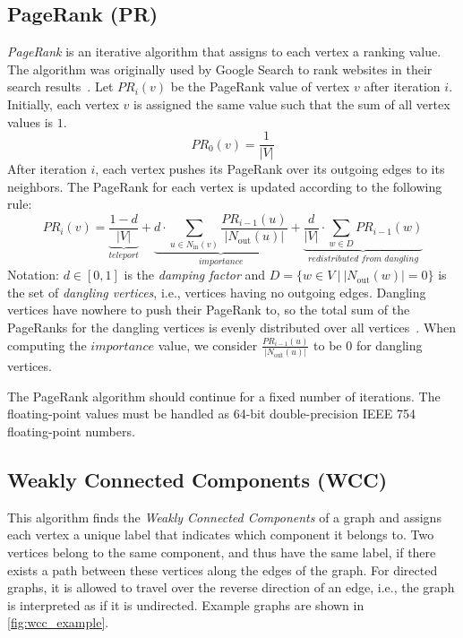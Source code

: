 \subsection{PageRank (PR)}
\label{sec:pr}
\emph{PageRank} is an iterative algorithm that assigns to each vertex a ranking value. The algorithm was originally used by Google Search to rank websites in their search results~\cite{page1999pagerank}. Let $\textit{PR}_i(v)$ be the PageRank value of vertex $v$ after iteration $i$. Initially, each vertex $v$ is assigned the same value such that the sum of all vertex values is $1$.
%
\begin{equation}
\textit{PR}_0(v) = \frac{1}{|V|}
\end{equation}
%
After iteration $i$, each vertex pushes its PageRank over its outgoing edges to its neighbors. The PageRank for each vertex is updated according to the following rule:
%
\begin{equation}
\textit{PR}_i(v) =
  \underbrace{\frac{1-d}{|V|}}_\textit{teleport} +
  \underbrace{d \cdot \sum_{u \in N_\mathrm{in}(v)} \frac{\textit{PR}_{i - 1}(u)}{|N_\mathrm{out}(u)|}}_\textit{importance} +
  \underbrace{\frac{d}{|V|} \cdot \sum_{w \in D} \textit{PR}_{i - 1}(w)}_\textit{redistributed from dangling}
\end{equation}
%
Notation: $d \in [0,1]$ is the \emph{damping factor} and $D = \big\{w \in V \ \big| \ |N_\mathrm{out}(w)| = 0 \big\}$ is the set of \emph{dangling vertices}, i.e., vertices having no outgoing edges.
Dangling vertices have nowhere to push their PageRank to, so the total sum of the PageRanks for the dangling vertices is evenly distributed over all vertices~\cite{DBLP:conf/www/EironMT04}.
When computing the $\textit{importance}$ value, we consider $\frac{\textit{PR}_{i-1}(u)}{|N_\mathrm{out}(u)|}$ to be $0$ for dangling vertices. 

The PageRank algorithm should continue for a fixed number of iterations. The floating-point values must be handled as 64-bit double-precision IEEE 754 floating-point numbers. 


\subsection{Weakly Connected Components (WCC)}
\label{sec:wcc}
This algorithm finds the \emph{Weakly Connected Components} of a graph and assigns each vertex a unique label that indicates which component it belongs to. Two vertices belong to the same component, and thus have the same label, if there exists a path between these vertices along the edges of the graph. For directed graphs, it is allowed to travel over the reverse direction of an edge, i.e., the graph is interpreted as if it is undirected.
Example graphs are shown in \autoref{fig:wcc_example}.


